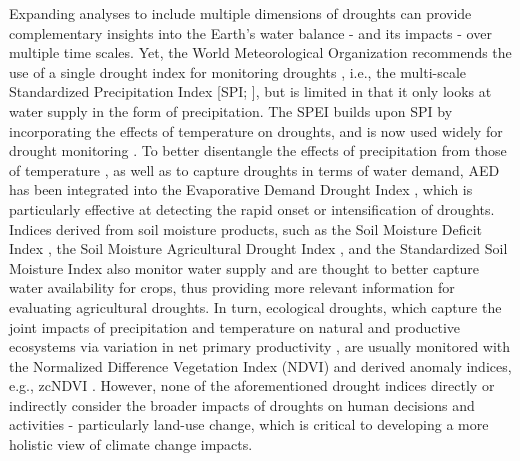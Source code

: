 \documentclass[
  sn-nature,
  numbered]{sn-jnl}
\begin{document}
Expanding analyses to include multiple dimensions of droughts can
provide complementary insights into the Earth's water balance - and its
impacts - over multiple time scales. Yet, the World Meteorological
Organization recommends the use of a single drought index for monitoring
droughts \citep{WMO2012}, i.e., the multi-scale Standardized
Precipitation Index {[}SPI; \citet{McKee1993}{]}, but is limited in that
it only looks at water supply in the form of precipitation. The SPEI
builds upon SPI by incorporating the effects of temperature on droughts,
and is now used widely for drought monitoring
\citep[e.g.,][]{Gebrechorkos2023, Liu2024}. To better disentangle the
effects of precipitation from those of temperature
\citep{Vicente-Serrano2020}, as well as to capture droughts in terms of
water demand, AED has been integrated into the Evaporative Demand
Drought Index \citep[EDDI,][]{McEvoy2016}, which is particularly
effective at detecting the rapid onset or intensification of droughts.
Indices derived from soil moisture products, such as the Soil Moisture
Deficit Index \citep[SDMI,][]{Narasimhan2005}, the Soil Moisture
Agricultural Drought Index \citep[SMADI,][]{Souza2021}, and the
Standardized Soil Moisture Index
\citep[SSI,][]{AghaKouchak2014, AghaKouchak2015} also monitor water
supply and are thought to better capture water availability for crops,
thus providing more relevant information for evaluating agricultural
droughts. In turn, ecological droughts, which capture the joint impacts
of precipitation and temperature on natural and productive ecosystems
via variation in net primary productivity
\citep{Camps-Valls2021, Paruelo2016, Helman2014}, are usually monitored
with the Normalized Difference Vegetation Index (NDVI) and derived
anomaly indices, e.g., zcNDVI \citep{Zambrano2018}. However, none of the
aforementioned drought indices directly or indirectly consider the
broader impacts of droughts on human decisions and activities -
particularly land-use change, which is critical to developing a more
holistic view of climate change impacts.
\end{document}
